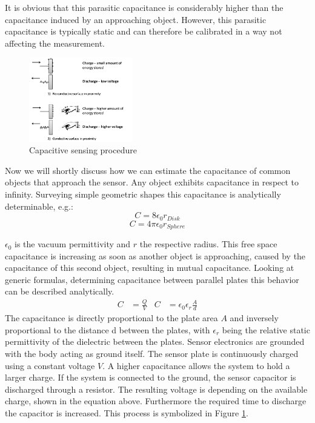 It is obvious that this parasitic capacitance is considerably higher than the capacitance induced by an approaching object. However, this parasitic capacitance is typically static and can therefore be calibrated in a way not affecting the measurement. 
\begin{figure}[h]
\centering
\includegraphics[width=0.4\textwidth]{images/cap_procedure.png}
\caption{Capacitive sensing procedure}
\label{fig:cap_procedure}
\end{figure} 
Now we will shortly discuss how we can estimate the capacitance of common objects that approach the sensor. Any object exhibits capacitance in respect to infinity. Surveying simple geometric shapes this capacitance is analytically determinable, e.g.:
\begin{equation}
C=8\epsilon_{0}r_{Disk}
\end{equation}
\begin{equation}
C=4\pi\epsilon_{0}r_{Sphere}
\end{equation}

\(\epsilon_{0}\) is the vacuum permittivity and \(r\) the respective radius. This free space capacitance is increasing as soon as another object is approaching, caused by the capacitance of this second object, resulting in mutual capacitance. Looking at generic formulas, determining capacitance between parallel plates this behavior can be described analytically.
\begin{align}
C&=\frac{Q}{V} & C&=\epsilon_{0}\epsilon_{r}\frac{A}{d}
\end{align}
The capacitance is directly proportional to the plate area \(A\) and inversely proportional to the distance d between the plates, with \(\epsilon_{r}\) being the relative static permittivity of the dielectric between the plates. Sensor electronics are grounded with the body acting as ground itself. The sensor plate is continuously charged using a constant voltage \(V\). A higher capacitance allows the system to hold a larger charge. If the system is connected to the ground, the sensor capacitor is discharged through a resistor. The resulting voltage is depending on the available charge, shown in the equation above. Furthermore the required time to discharge the capacitor is increased. This process is symbolized in Figure \ref{fig:cap_procedure}.

